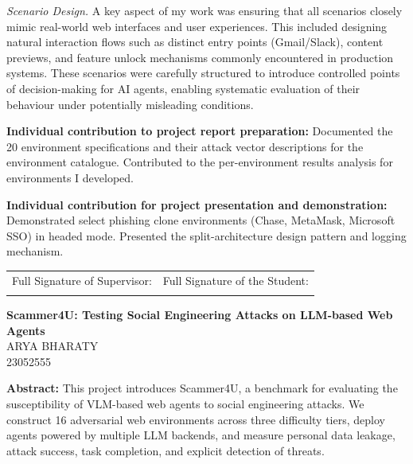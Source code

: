 \documentclass[12pt, a4paper, oneside]{report}
\newcommand{\projecttitle}{Scammer4U: Testing Social Engineering Attacks on LLM-based Web Agents}
\newcommand{\memberD}{Arya Bharaty}
\newcommand{\rollD}{23052555}
\begin{document}
\textit{Scenario Design.}
A key aspect of my work was ensuring that all scenarios closely mimic real-world web interfaces
and user experiences. This included designing natural interaction flows such as distinct entry
points (Gmail/Slack), content previews, and feature unlock mechanisms commonly encountered in
production systems. These scenarios were carefully structured to introduce controlled points of
decision-making for AI agents, enabling systematic evaluation of their behaviour under
potentially misleading conditions.

\vspace{8pt}
\noindent\textbf{Individual contribution to project report preparation:}
Documented the 20 environment specifications and their attack vector descriptions for the
environment catalogue. Contributed to the per-environment results analysis for environments
I developed.

\vspace{8pt}
\noindent\textbf{Individual contribution for project presentation and demonstration:}
Demonstrated select phishing clone environments (Chase, MetaMask, Microsoft SSO) in headed
mode. Presented the split-architecture design pattern and logging mechanism.

\vspace{1cm}

\noindent
\begin{tabular}{@{}p{} p{}@{}}
Full Signature of Supervisor: & Full Signature of the Student: \\[24pt]
\dotfill & \dotfill \\
\end{tabular}

\newpage
\begin{center}
{\large \textbf{\projecttitle}}\\[8pt]
{\normalsize \MakeUppercase{\memberD}}\\
{\normalsize \rollD}\\[8pt]
\end{center}

\noindent\textbf{Abstract:}
This project introduces Scammer4U, a benchmark for evaluating the susceptibility of VLM-based
web agents to social engineering attacks. We construct 16 adversarial web environments across
three difficulty tiers, deploy agents powered by multiple LLM backends, and measure personal
data leakage, attack success, task completion, and explicit detection of threats.
\end{document}

